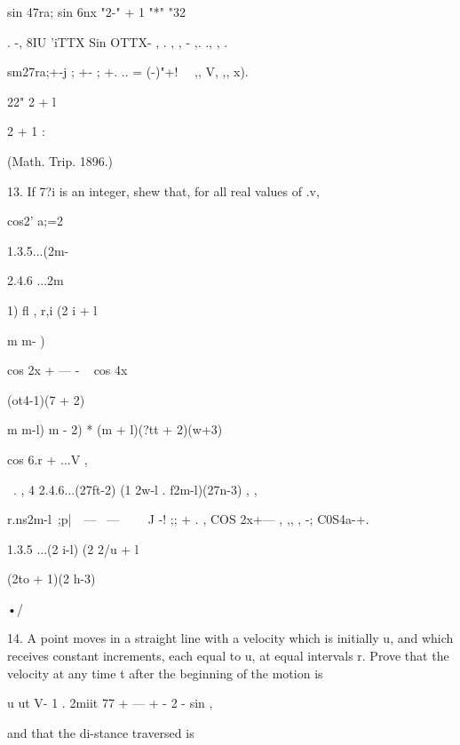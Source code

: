 {sin 47ra; sin 6nx "2-" + 1 "*" "32



. -, 8IU 'iTTX Sin OTTX- , . , , - ,. ., , .

sm27ra;+-j ; +- ; +. .. = (-)"+! \ \ ,, V, ,, x).



22" 2 + l

2 + 1 :



(Math. Trip. 1896.)



13. If 7?i is an integer, shew that, for all real values of .v,



cos2' a;=2



1.3.5...(2m-



2.4.6 ...2m



1) fl , r,i (2 i + l



m m- )

cos 2x + — - ~ cos 4x

(ot4-1)(7 + 2)

m m-l) m - 2) * (m + l)(?tt + 2)(w+3)



cos 6.r + ...V ,



  \ . , 4 2.4.6...(27ft-2) (1 2w-l . f2m-l)(27n-3) , ,

r.ns2m-l\ ;p|\ \ — \ — \ \ \ \ J -! ;; + . , COS 2x+— , ,, , -;
C0S4a-+.



1.3.5 ...(2 i-l) (2 2/u + l



(2to + 1)(2 h-3)



•/



14. A point moves in a straight line with a velocity which is
initially u, and which receives constant increments, each equal to u,
at equal intervals r. Prove that the velocity at any time t after the
beginning of the motion is



u ut V- 1 . 2miit 77 + — + - 2 - sin ,



and that the di-stance traversed is



}
